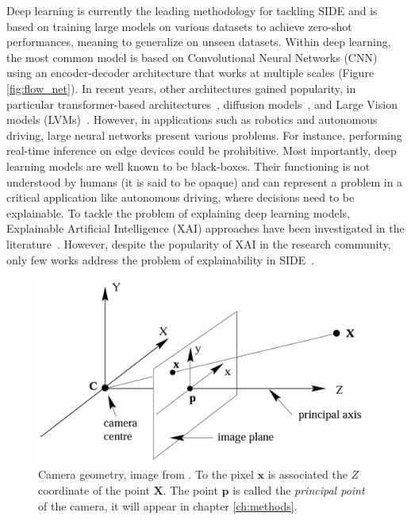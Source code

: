 Deep learning is currently the leading methodology for tackling SIDE and is based on training large models on various datasets to achieve zero-shot performances, meaning to generalize on unseen datasets.
Within deep learning, the most common model is based on Convolutional Neural Networks (CNN) using an encoder-decoder architecture that works at multiple scales (Figure \ref{fig:flow_net}).
In recent years, other architectures gained popularity, in particular transformer-based architectures~\cite{denseViT, PatchFusion}, diffusion models~\cite{Marigold}, and Large Vision models (LVMs)~\cite{Marigold}.
However, in applications such as robotics and autonomous driving, large neural networks present various problems.
For instance, performing real-time inference on edge devices could be prohibitive.
Most importantly, deep learning models are well known to be black-boxes.
Their functioning is not understood by humans (it is said to be opaque) and can represent a problem in a critical application like autonomous driving, where decisions need to be explainable.
To tackle the problem of explaining deep learning models, Explainable Artificial Intelligence (XAI) approaches have been investigated in the literature~\cite{XAI_review}.
However, despite the popularity of XAI in the research community, only few works address the problem of explainability in SIDE~\cite{Hu, Dijk, towards_interpretable}.

\begin{figure}
    \centering
    \includegraphics[scale=0.3]{figs/coordinates}
    \caption{
        Camera geometry, image from \cite{multiview}.
        To the pixel $\mathbf{x}$ is associated the $Z$ coordinate of the point $\mathbf{X}$.
        The point $\mathbf{p}$ is called the \textit{principal point} of the camera, it will appear in chapter \ref{ch:methods}.
        \label{fig:coordinates}
    }
\end{figure}

